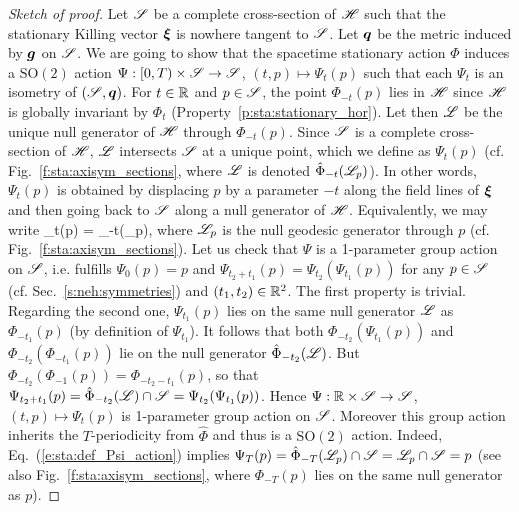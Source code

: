 \begin{proof}[Sketch of proof]
Let $\mathscr{S}$ be a complete cross-section of $\mathscr{H}$ such that the stationary Killing
vector $\bm{\xi}$ is nowhere tangent to $\mathscr{S}$.
Let $\bm{q}$ be the metric induced by $\bm{g}$ on $\mathscr{S}$.
We are going to show that the
spacetime stationary action $\Phi$
induces a $\mathrm{SO}(2)$ action $\Psi: [0,T) \times \mathscr{S} \to \mathscr{S}$, $(t,p) \mapsto \Psi_t(p)$
such that each $\Psi_t$ is an isometry of $(\mathscr{S},\bm{q})$.
For $t\in\mathbb{R}$ and $p\in\mathscr{S}$, the point
$\Phi_{-t}(p)$ lies in $\mathscr{H}$ since $\mathscr{H}$ is globally invariant by
$\Phi_t$ (Property~\ref{p:sta:stationary_hor}). Let then $\mathscr{L}$ be the unique
null generator of $\mathscr{H}$ through $\Phi_{-t}(p)$. Since $\mathscr{S}$
is a complete cross-section of $\mathscr{H}$, $\mathscr{L}$ intersects $\mathscr{S}$ at a unique
point, which we define as $\Psi_t(p)$ (cf. Fig.~\ref{f:sta:axisym_sections}, where
$\mathscr{L}$ is denoted $\hat{\Phi}_{-t}(\mathscr{L}_p)$).
In other words, $\Psi_t(p)$ is obtained by displacing $p$ by a parameter $-t$ along the field lines of $\bm{\xi}$ and then going back to $\mathscr{S}$ along a null generator of $\mathscr{H}$.
Equivalently, we may write
\be \label{e:sta:def_Psi_action}
    \Psi_t(p) = \hat{\Phi}_{-t}(\Li_p)\cap\Sp,
\ee
where $\mathscr{L}_p$ is the null geodesic generator through $p$ (cf. Fig.~\ref{f:sta:axisym_sections}).
Let us check that $\Psi$ is a 1-parameter group action on $\mathscr{S}$,
i.e. fulfills $\Psi_0(p) = p$ and $\Psi_{t_2 + t_1}(p) = \Psi_{t_2} (\Psi_{t_1} (p))$
for any $p\in \mathscr{S}$ (cf. Sec.~\ref{s:neh:symmetries}) and $(t_1, t_2)\in \mathbb{R}^2$.
The first property is trivial. Regarding the second one,
$\Psi_{t_1}(p)$ lies on the same
null generator $\mathscr{L}$ as $\Phi_{-t_1}(p)$ (by definition of $\Psi_{t_1}$).
It follows that both $\Phi_{-t_2}(\Psi_{t_1}(p))$ and
$\Phi_{-t_2}(\Phi_{-t_1}(p))$ lie on the null generator $\hat{\Phi}_{-t_2}(\mathscr{L})$.
But $\Phi_{-t_2}(\Phi_{-1}(p)) = \Phi_{-t_2-t_1}(p)$, so that
$\Psi_{t_2 + t_1}(p) = \hat{\Phi}_{-t_2}(\mathscr{L}) \cap \mathscr{S} = \Psi_{t_2} (\Psi_{t_1} (p))$.
Hence $\Psi: \mathbb{R} \times \mathscr{S} \to \mathscr{S}$, $(t,p) \mapsto \Psi_t(p)$ is 1-parameter
group action on $\mathscr{S}$. Moreover this group action inherits the $T$-periodicity
from $\hat{\Phi}$ and thus is a $\mathrm{SO}(2)$ action.
Indeed, Eq.~(\ref{e:sta:def_Psi_action}) implies
$\Psi_T(p) = \hat{\Phi}_{-T}(\mathscr{L}_p)\cap\mathscr{S} = \mathscr{L}_p \cap \mathscr{S} = p$
(see also Fig.~\ref{f:sta:axisym_sections}, where $\Phi_{-T}(p)$ lies on the
same null generator as $p$).


\end{proof}
